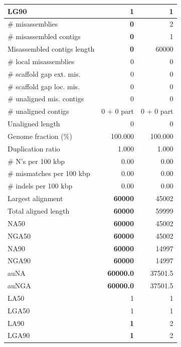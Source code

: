 \documentclass[12pt,a4paper]{article}
\begin{document}
\begin{table}[ht]
\begin{center}
\begin{tabular}{|l*{2}{|r}|}
LG90 & 1 & 1 \\ \hline
\# misassemblies & {\bf 0} & 2 \\ \hline
\# misassembled contigs & {\bf 0} & 1 \\ \hline
Misassembled contigs length & {\bf 0} & 60000 \\ \hline
\# local misassemblies & 0 & 0 \\ \hline
\# scaffold gap ext. mis. & 0 & 0 \\ \hline
\# scaffold gap loc. mis. & 0 & 0 \\ \hline
\# unaligned mis. contigs & 0 & 0 \\ \hline
\# unaligned contigs & 0 + 0 part & 0 + 0 part \\ \hline
Unaligned length & 0 & 0 \\ \hline
Genome fraction (\%) & 100.000 & 100.000 \\ \hline
Duplication ratio & 1.000 & 1.000 \\ \hline
\# N's per 100 kbp & 0.00 & 0.00 \\ \hline
\# mismatches per 100 kbp & 0.00 & 0.00 \\ \hline
\# indels per 100 kbp & 0.00 & 0.00 \\ \hline
Largest alignment & {\bf 60000} & 45002 \\ \hline
Total aligned length & {\bf 60000} & 59999 \\ \hline
NA50 & {\bf 60000} & 45002 \\ \hline
NGA50 & {\bf 60000} & 45002 \\ \hline
NA90 & {\bf 60000} & 14997 \\ \hline
NGA90 & {\bf 60000} & 14997 \\ \hline
auNA & {\bf 60000.0} & 37501.5 \\ \hline
auNGA & {\bf 60000.0} & 37501.5 \\ \hline
LA50 & 1 & 1 \\ \hline
LGA50 & 1 & 1 \\ \hline
LA90 & {\bf 1} & 2 \\ \hline
LGA90 & {\bf 1} & 2 \\ \hline
\end{tabular}
\end{center}
\end{table}
\end{document}
